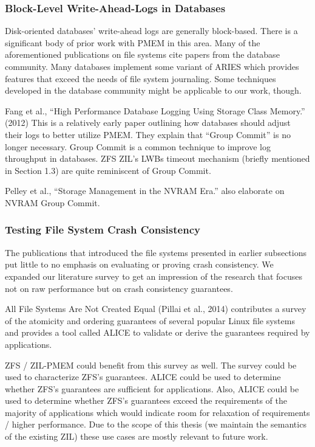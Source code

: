 \documentclass[12pt,a4paper,twoside,draft]{book}
\begin{document}
\subsubsection{Block-Level Write-Ahead-Logs in Databases}
Disk-oriented databases’ write-ahead logs are generally block-based. There is a significant body of prior work with PMEM in this area. Many of the aforementioned publications on file systems cite papers from the database community.
Many databases implement some variant of ARIES which provides features that exceed the needs of file system journaling. Some techniques developed in the database community might be applicable to our work, though.

Fang et al., “High Performance Database Logging Using Storage Class Memory.” (2012) This is a relatively early paper outlining how databases should adjust their logs to better utilize PMEM. They explain that “Group Commit” is no longer necessary. Group Commit is a common technique to improve log throughput in databases. ZFS ZIL’s LWBs timeout mechanism (briefly mentioned in Section 1.3) are quite reminiscent of Group Commit.\todo{!!!}

Pelley et al., “Storage Management in the NVRAM Era.” also elaborate on NVRAM Group Commit.

\subsubsection{Testing File System Crash Consistency}
The publications that introduced the file systems presented in earlier subsections put little to no emphasis on evaluating or proving crash consistency. We expanded our literature survey to get an impression of the research that focuses not on raw performance but on crash consistency guarantees.

All File Systems Are Not Created Equal (Pillai et al., 2014) contributes a survey of the atomicity and ordering guarantees of several popular Linux file systems and provides a tool called ALICE to validate or derive the guarantees required by applications.

ZFS / ZIL-PMEM could benefit from this survey as well. The survey could be used to characterize ZFS’s guarantees. ALICE could be used to determine whether ZFS’s guarantees are sufficient for applications. Also, ALICE could be used to determine whether ZFS’s guarantees exceed the requirements of the majority of applications which would  indicate room for relaxation of requirements / higher performance. Due to the scope of this thesis (we maintain the semantics of the existing ZIL) these use cases are mostly relevant to future work.
\end{document}
